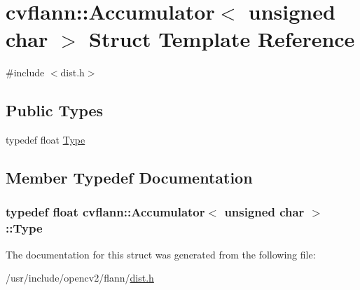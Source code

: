 \hypertarget{structcvflann_1_1Accumulator_3_01unsigned_01char_01_4}{\section{cvflann\-:\-:Accumulator$<$ unsigned char $>$ Struct Template Reference}
\label{structcvflann_1_1Accumulator_3_01unsigned_01char_01_4}
}


{\ttfamily \#include $<$dist.\-h$>$}

\subsection*{Public Types}
\begin{DoxyCompactItemize}
\item 
typedef float \hyperlink{structcvflann_1_1Accumulator_3_01unsigned_01char_01_4_af4b96e54d6c9facb7fc8a290d9b766d9}{Type}
\end{DoxyCompactItemize}


\subsection{Member Typedef Documentation}
\hypertarget{structcvflann_1_1Accumulator_3_01unsigned_01char_01_4_af4b96e54d6c9facb7fc8a290d9b766d9}{
\subsubsection[{Type}]{\setlength{\rightskip}{0pt plus 5cm}typedef float {\bf cvflann\-::\-Accumulator}$<$ unsigned char $>$\-::{\bf Type}}}\label{structcvflann_1_1Accumulator_3_01unsigned_01char_01_4_af4b96e54d6c9facb7fc8a290d9b766d9}


The documentation for this struct was generated from the following file\-:\begin{DoxyCompactItemize}
\item 
/usr/include/opencv2/flann/\hyperlink{dist_8h}{dist.\-h}\end{DoxyCompactItemize}

